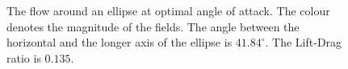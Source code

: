 \documentclass[12pt, a4paper]{article}
\begin{document}
\begin{figure}[htbp]
    \centering
     \qquad
    \caption{The flow around an ellipse at optimal angle of attack. The colour denotes the magnitude of the fields. The angle between the horizontal and the longer axis of the ellipse is $41.84^{\circ}$. The Lift-Drag ratio is $0.135$.}
    \label{fig_opt_ellipse}
\end{figure}
\end{document}

